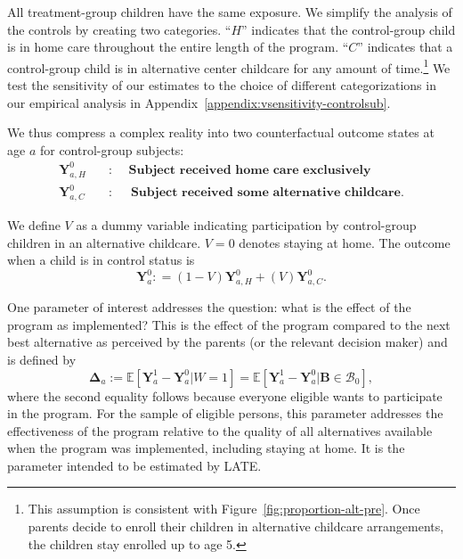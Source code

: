 All treatment-group children have the same exposure. We simplify the analysis of the controls by creating two categories. ``$H$'' indicates that the control-group child is in home care throughout the entire length of the program. ``$C$'' indicates that a control-group child is in alternative center childcare for any amount of time.\footnote{This assumption is consistent with Figure~\ref{fig:proportion-alt-pre}. Once parents decide to enroll their children in alternative childcare arrangements, the children stay enrolled up to age 5.} We test the sensitivity of our estimates to the choice of different categorizations in our empirical analysis in Appendix~\ref{appendix:vsensitivity-controlsub}.

We thus compress a complex reality into two counterfactual outcome states at age $a$ for control-group subjects:
\begin{align*}
\bm{Y}_{a,H}^0 \quad &: \quad \textbf{ Subject received home care exclusively} \\
\bm{Y}_{a,C}^0 \quad &: \quad \textbf{ Subject received some alternative childcare}.
\end{align*}

We define $V$ as a dummy variable indicating participation by control-group children in an alternative childcare. $V=0$ denotes staying at home. The outcome when a child is in control status is
\begin{equation}
\bm{Y}^0_a : = \left( 1 - V \right) \bm{Y}^0_{a,H} + \left( V \right) \bm{Y}^0_{a,C}. \label{eq:meandiff}
\end{equation}

One parameter of interest addresses the question: what is the effect of the program as implemented? This is the effect of the program compared to the next best alternative as perceived by the parents (or the relevant decision maker) and is defined by
\begin{equation}\label{eq:effect}
\bm{\Delta}_a := \mathbb{E} \left[ \bm{Y}^1_a -  \bm{Y}^0_a | W =1 \right] = \mathbb{E} \left[\bm{Y}^1_a - \bm{Y}^0_a | \bm{B} \in \mathcal{B}_0 \right],
\end{equation}
where the second equality follows because everyone eligible wants to participate in the program. For the sample of eligible persons, this parameter addresses the effectiveness of the program relative to the quality of all alternatives available when the program was implemented, including staying at home. It is the parameter intended to be estimated by LATE.

